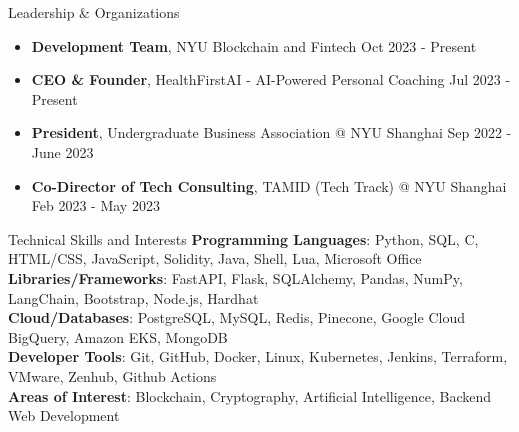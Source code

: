 \documentclass{resume} %
\begin{document}
\begin{rSection}{Leadership \& Organizations}
	\begin{itemize}
		\item \textbf{Development Team}{, NYU Blockchain and Fintech} \hfill Oct 2023 - Present
		\item \textbf{CEO \& Founder}{, HealthFirstAI - AI-Powered Personal Coaching} \hfill Jul 2023 - Present
		\item \textbf{President}{, Undergraduate Business Association @ NYU Shanghai} \hfill Sep 2022 - June 2023
		\item \textbf{Co-Director of Tech Consulting}{, TAMID (Tech Track) @ NYU Shanghai} \hfill Feb 2023 - May 2023
	\end{itemize}
\end{rSection}


\begin{rSection}{Technical Skills and Interests}
	\textbf{Programming Languages}{: Python, SQL, C, HTML/CSS, JavaScript, Solidity, Java, Shell, Lua, Microsoft Office} \\
	\textbf{Libraries/Frameworks}{: FastAPI, Flask, SQLAlchemy, Pandas, NumPy, LangChain, Bootstrap, Node.js, Hardhat} \\
	\textbf{Cloud/Databases}{: PostgreSQL, MySQL, Redis, Pinecone, Google Cloud BigQuery, Amazon EKS, MongoDB} \\
	\textbf{Developer Tools}{: Git, GitHub, Docker, Linux, Kubernetes, Jenkins, Terraform, VMware, Zenhub, Github Actions} \\
	\textbf{Areas of Interest}{: Blockchain, Cryptography, Artificial Intelligence, Backend Web Development}
\end{rSection}
\end{document}
